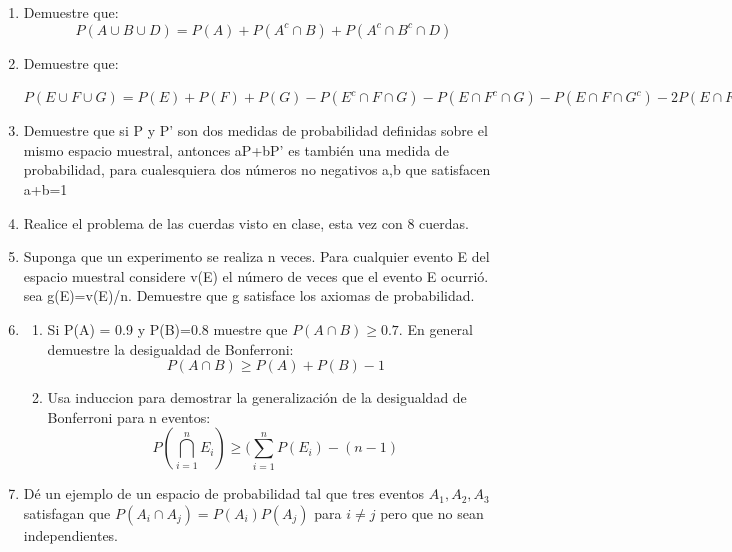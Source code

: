 \documentclass[12pt,a4paper]{report}
\begin{document}
\begin{enumerate}
   \item {
    Demuestre que:\\
	$$P(A \cup B \cup D) = P(A)+P(A^c \cap B) +P(A^c \cap B^c \cap D)$$
	}
	
   \item {
    Demuestre que:\\
	\begin{center}
	$P(E \cup F \cup G) = P(E) + P(F) + P(G) - P(E^c \cap F \cap G) -P(E \cap F^c \cap G) - P(E \cap F \cap G^c)-2P(E \cap F \cap G)$
	\end{center}
	}
	
   \item {
    Demuestre que si P y P' son dos medidas de probabilidad definidas sobre el mismo espacio muestral, antonces aP+bP' es también una medida de probabilidad, para cualesquiera dos números no negativos a,b que satisfacen a+b=1\\
	}
	
   \item {
    Realice el problema de las cuerdas visto en clase, esta vez con 8 cuerdas.\\
	}
	
		
   \item {
   	Suponga que un experimento se realiza n veces. Para cualquier evento E del espacio muestral considere v(E) el número de veces que el evento E ocurrió. sea g(E)=v(E)/n. Demuestre que g satisface los axiomas de probabilidad.\\
	}
	
   \item {
  	\begin{enumerate}[label=\alph*) ]
   \item {
	Si P(A) = 0.9 y P(B)=0.8 muestre que $P(A \cap B) \geq 0.7$. En general demuestre la desigualdad de Bonferroni:\\
	$$P(A \cap B) \geq P(A)+P(B) -1$$
   }

   \item {
 Usa induccion para demostrar la generalización de la desigualdad de Bonferroni para n eventos:\\
 $$P(\bigcap\limits_{i=1}^{n} E_{i}) \geq (\sum_{i=1}^{n} P(E_{i})-(n-1)$$

   }
   

  

	\end{enumerate}
	}
	
  \item{
  Dé un ejemplo de un espacio de probabilidad tal que tres eventos $A_{1},A_{2},A_{3}$ satisfagan que $P(A_{i} \cap A_{j})=P(A_{i})P(A_{j})$ para $i\neq j$ pero que no sean independientes.
  }
  

\end{enumerate}
\end{document}
